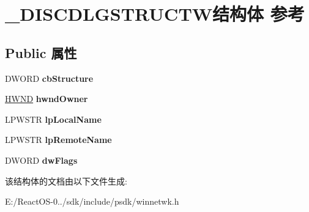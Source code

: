 \hypertarget{struct___d_i_s_c_d_l_g_s_t_r_u_c_t_w}{}\section{\+\_\+\+D\+I\+S\+C\+D\+L\+G\+S\+T\+R\+U\+C\+T\+W结构体 参考}
\label{struct___d_i_s_c_d_l_g_s_t_r_u_c_t_w}
\subsection*{Public 属性}
\begin{DoxyCompactItemize}
\item 
\mbox{\label{struct___d_i_s_c_d_l_g_s_t_r_u_c_t_w_a112ff264f66a2f5a70c2470bd6c5b9ae}} 
D\+W\+O\+RD {\bfseries cb\+Structure}
\item 
\mbox{\label{struct___d_i_s_c_d_l_g_s_t_r_u_c_t_w_a60ca1dd06a65eab0519e24b6bf6650d6}} 
\hyperlink{interfacevoid}{H\+W\+ND} {\bfseries hwnd\+Owner}
\item 
\mbox{\label{struct___d_i_s_c_d_l_g_s_t_r_u_c_t_w_acd620d4e275f99ab6e7c7ba99b17f1d7}} 
L\+P\+W\+S\+TR {\bfseries lp\+Local\+Name}
\item 
\mbox{\label{struct___d_i_s_c_d_l_g_s_t_r_u_c_t_w_a6d0eef2f27a98c1334a45f22d815eaab}} 
L\+P\+W\+S\+TR {\bfseries lp\+Remote\+Name}
\item 
\mbox{\label{struct___d_i_s_c_d_l_g_s_t_r_u_c_t_w_a7c27a4a3bd1b71ae3c46a48fb95f7609}} 
D\+W\+O\+RD {\bfseries dw\+Flags}
\end{DoxyCompactItemize}


该结构体的文档由以下文件生成\+:\begin{DoxyCompactItemize}
\item 
E\+:/\+React\+O\+S-\/0../sdk/include/psdk/winnetwk.\+h\end{DoxyCompactItemize}
